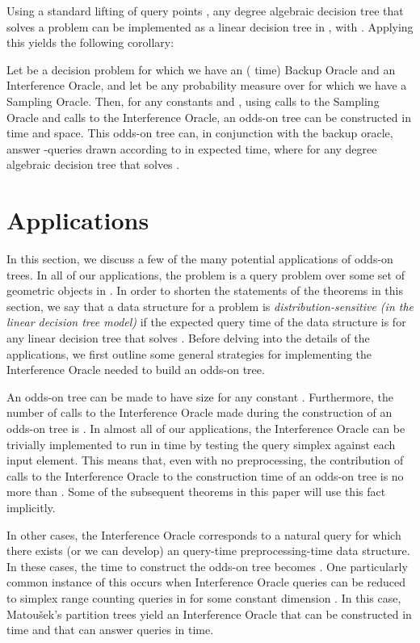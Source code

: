 \documentclass{patmorin}
\begin{document}
Using a standard lifting of query points \cite{yy85}, any degree 
algebraic decision tree that solves a problem  can be implemented as a linear decision tree in , with
.  Applying this yields the following corollary:

\begin{cor}
  Let  be a decision problem for which we
  have an ( time) Backup Oracle and an Interference Oracle,
  and let  be any probability measure over  for which we have a
  Sampling Oracle.  Then, for any constants  and ,
  using  calls to the Sampling Oracle and 
  calls to the Interference Oracle, an odds-on tree can be constructed in
   time and  space.  This odds-on tree can,
  in conjunction with the backup oracle, answer -queries
  drawn according to  in  expected time, where  for any degree  algebraic decision tree  that
  solves .
\end{cor}


\section{Applications}

In this section, we discuss a few of the many potential applications of
odds-on trees.  In all of our applications, the problem  is a
query problem over some set of  geometric objects in .  In order
to shorten the statements of the theorems in this section, we say that a
data structure for a problem  is \emph{distribution-sensitive
(in the linear decision tree model)} if the expected query time of
the data structure is  for any linear decision tree
 that solves . Before delving into the details of the
applications, we first outline some general strategies for implementing
the Interference Oracle needed to build an odds-on tree.

An odds-on tree can be made to have size  for any
constant .  Furthermore, the number of calls to the
Interference Oracle made during the construction of an odds-on tree is
.  In almost all of our applications, the Interference
Oracle can be trivially implemented to run in  time by testing
the query simplex  against each input element.  This means
that, even with no preprocessing, the contribution of calls to the
Interference Oracle to the construction time of an odds-on tree is no more
than .  Some of the subsequent theorems in this paper
will use this fact implicitly.

In other cases, the Interference Oracle corresponds to a natural query for
which there exists (or we can develop) an  query-time
 preprocessing-time data structure.  In these cases, the time
to construct the odds-on tree becomes .  One particularly
common instance of this occurs when Interference Oracle queries can
be reduced to  simplex range counting queries in  for
some constant dimension .  In this case, Matou\v{s}ek's partition
trees \cite{m92} yield an Interference Oracle that can be constructed in
 time and that can answer queries in 
time. 
\end{document}
